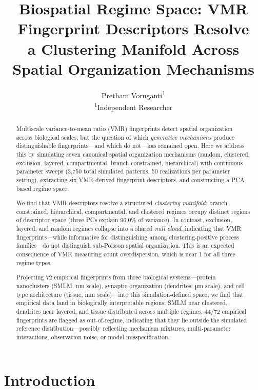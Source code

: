 \documentclass[11pt,a4paper]{article}
\title{Biospatial Regime Space: VMR Fingerprint Descriptors Resolve\\a Clustering Manifold Across Spatial Organization Mechanisms}
\author{
  Pretham Voruganti\textsuperscript{1}
  \\[0.5em]
  \small\textsuperscript{1}Independent Researcher
}
\date{}
\begin{document}
\maketitle

\begin{abstract}
Multiscale variance-to-mean ratio (VMR) fingerprints detect spatial
organization across biological scales, but the question of which
\emph{generative mechanisms} produce distinguishable fingerprints---and
which do not---has remained open. Here we address this by simulating
seven canonical spatial organization mechanisms (random, clustered,
exclusion, layered, compartmental, branch-constrained, hierarchical)
with continuous parameter sweeps (3,750 total simulated patterns, 50
realizations per parameter setting), extracting six VMR-derived
fingerprint descriptors, and constructing a PCA-based regime space.

We find that VMR descriptors resolve a structured \emph{clustering
manifold}: branch-constrained, hierarchical, compartmental, and
clustered regimes occupy distinct regions of descriptor space
(three PCs explain 96.0\% of variance). In contrast, exclusion, layered,
and random regimes collapse into a shared \emph{null cloud}, indicating
that VMR fingerprints---while informative for distinguishing among
clustering-positive process families---do not distinguish sub-Poisson
spatial organization. This is an expected consequence of VMR measuring
count overdispersion, which is near 1 for all three regime types.

Projecting 72 empirical fingerprints from three biological systems---protein
nanoclusters (SMLM, nm scale), synaptic organization (dendrites,
\si{\micro\meter} scale), and cell type architecture (tissue,
\si{\milli\meter} scale)---into this simulation-defined space, we find
that empirical data land in biologically interpretable regions: SMLM
near clustered, dendrites near layered, and tissue distributed across
multiple regimes. 44/72 empirical fingerprints are flagged as
out-of-regime, indicating that they lie outside the simulated reference
distribution---possibly reflecting mechanism mixtures, multi-parameter
interactions, observation noise, or model misspecification.
\end{abstract}

\clearpage

\section{Introduction}
\label{sec:intro}
\end{document}
